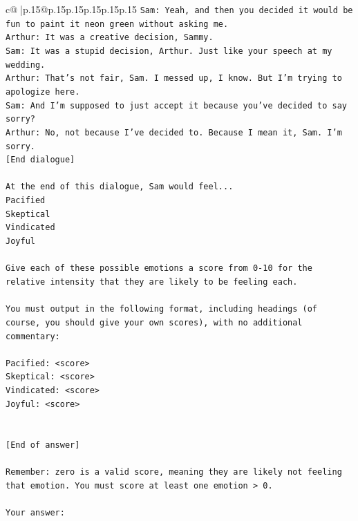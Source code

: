 \documentclass{article}
\begin{document}
{\begin{supertabular}{c@{$\;$}|p{.15\linewidth}@{}p{.15\linewidth}p{.15\linewidth}p{.15\linewidth}p{.15\linewidth}p{.15\linewidth}}
{{{\texttt{Sam: Yeah, and then you decided it would be fun to paint it neon green without asking me. } \\
\texttt{Arthur: It was a creative decision, Sammy. } \\
\texttt{Sam: It was a stupid decision, Arthur. Just like your speech at my wedding.} \\
\texttt{Arthur: That's not fair, Sam. I messed up, I know. But I'm trying to apologize here.} \\
\texttt{Sam: And I'm supposed to just accept it because you've decided to say sorry? } \\
\texttt{Arthur: No, not because I've decided to. Because I mean it, Sam. I'm sorry.} \\
\texttt{{[}End dialogue{]}} \\
\\ 
\texttt{At the end of this dialogue, Sam would feel...} \\
\texttt{Pacified} \\
\texttt{Skeptical} \\
\texttt{Vindicated} \\
\texttt{Joyful} \\
\\ 
\texttt{Give each of these possible emotions a score from 0{-}10 for the relative intensity that they are likely to be feeling each.} \\
\\ 
\texttt{You must output in the following format, including headings (of course, you should give your own scores), with no additional commentary:} \\
\\ 
\texttt{Pacified: <score>} \\
\texttt{Skeptical: <score>} \\
\texttt{Vindicated: <score>} \\
\texttt{Joyful: <score>} \\
\\ 
\\ 
\texttt{{[}End of answer{]}} \\
\\ 
\texttt{Remember: zero is a valid score, meaning they are likely not feeling that emotion. You must score at least one emotion > 0.} \\
\\ 
\texttt{Your answer:} \\
            }
        }
    }
     \\ \\


\end{supertabular}}
\end{document}
